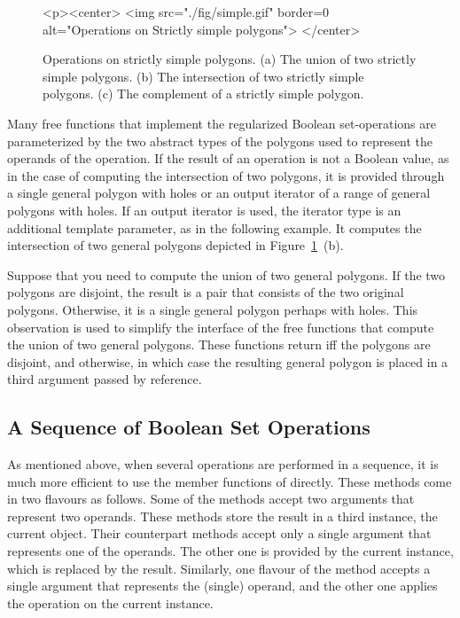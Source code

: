 \begin{figure}[!htp]
\begin{ccTexOnly}

\end{ccTexOnly}
\begin{ccHtmlOnly}
  <p><center>
    <img src="./fig/simple.gif" border=0 alt="Operations on Strictly
    simple polygons">
  </center>
\end{ccHtmlOnly}
\caption{\label{fig:simple}Operations on strictly simple polygons. (a) The union of two
strictly simple polygons. (b) The intersection of two strictly simple
polygons. (c) The complement of a strictly simple polygon.} 
\end{figure}

Many free functions that implement the regularized Boolean 
set-operations are parameterized by the two abstract types of the polygons 
used to represent the operands of the operation. 
If the result of an operation is not a Boolean value, as in the case of 
computing the intersection of two polygons, it is provided through a single 
general polygon with holes or an output iterator of a range of general
polygons with holes. If an output iterator is used, the iterator type is an 
additional template parameter, as in the following example. It 
computes the intersection of two general polygons depicted in 
Figure~\ref{fig:simple}~(b).


Suppose that you need to compute the union of two general polygons. If the
two polygons are disjoint, the result is a pair that consists of the two 
original polygons. Otherwise, it is a single general polygon perhaps with 
holes. This observation is used to simplify the interface of the free
functions that compute the union of two general polygons. These functions
return  iff the polygons are disjoint, and  otherwise,
in which case the resulting general polygon is placed in a third argument 
passed by reference.

\subsection{A Sequence of Boolean Set Operations}
\label{bso_ssec:sequence}
As mentioned above, when several operations are performed in a 
sequence, it is much more efficient to use the member functions of
 directly.
These methods come in two flavours as follows. Some of the methods accept two
arguments that represent two operands. These methods store the result
in a third instance, the current object. Their counterpart methods
accept only a single argument that represents one of the operands.
The other one is provided by the current instance, which is replaced by
the result. Similarly, one flavour of the  method
accepts a single argument that represents the (single) operand, and the 
other one applies the operation on the current instance.

